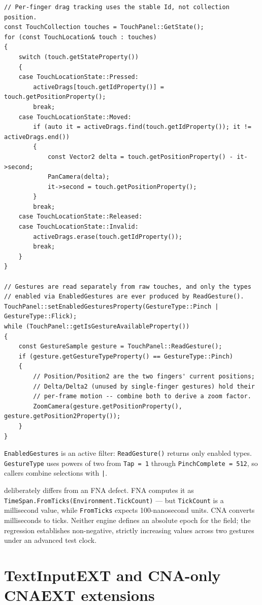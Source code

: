 \begin{lstlisting}
// Per-finger drag tracking uses the stable Id, not collection position.
const TouchCollection touches = TouchPanel::GetState();
for (const TouchLocation& touch : touches)
{
    switch (touch.getStateProperty())
    {
    case TouchLocationState::Pressed:
        activeDrags[touch.getIdProperty()] = touch.getPositionProperty();
        break;
    case TouchLocationState::Moved:
        if (auto it = activeDrags.find(touch.getIdProperty()); it != activeDrags.end())
        {
            const Vector2 delta = touch.getPositionProperty() - it->second;
            PanCamera(delta);
            it->second = touch.getPositionProperty();
        }
        break;
    case TouchLocationState::Released:
    case TouchLocationState::Invalid:
        activeDrags.erase(touch.getIdProperty());
        break;
    }
}

// Gestures are read separately from raw touches, and only the types
// enabled via EnabledGestures are ever produced by ReadGesture().
TouchPanel::setEnabledGesturesProperty(GestureType::Pinch | GestureType::Flick);
while (TouchPanel::getIsGestureAvailableProperty())
{
    const GestureSample gesture = TouchPanel::ReadGesture();
    if (gesture.getGestureTypeProperty() == GestureType::Pinch)
    {
        // Position/Position2 are the two fingers' current positions;
        // Delta/Delta2 (unused by single-finger gestures) hold their
        // per-frame motion -- combine both to derive a zoom factor.
        ZoomCamera(gesture.getPositionProperty(), gesture.getPosition2Property());
    }
}
\end{lstlisting}

\texttt{EnabledGestures} is an active filter: \texttt{ReadGesture()} returns only enabled
types. \texttt{GestureType} uses powers of two from \texttt{Tap = 1} through
\texttt{PinchComplete = 512}, so callers combine selections with \texttt{|}.

 deliberately differs from an FNA defect. FNA computes it as
\texttt{TimeSpan.FromTicks(Environment.TickCount)} --- but \texttt{TickCount} is a millisecond
value, while \texttt{FromTicks} expects 100-nanosecond units. CNA converts milliseconds to ticks.
Neither engine defines an absolute epoch for the field; the regression establishes non-negative,
strictly increasing values across two gestures under an advanced test clock.

\section{TextInputEXT and CNA-only CNAEXT extensions}


